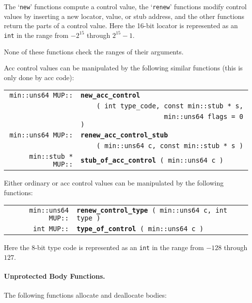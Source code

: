 \documentclass[12pt]{article}
\makeatletter
\newcommand{\subsubsubsection}[1]{\paragraph[#1]{#1.}}
\newcommand{\ttindex}[1]{\index{#1@{\tt #1}}}
\newcommand{\MUPindex}[1]{\ttindex{MUP::#1}\ttindex{#1}}
\newenvironment{indpar}[1][0.3in]%
	{\begin{list}{}%
		     {\setlength{\itemsep}{0in}%
		      \setlength{\topsep}{0in}%
		      \setlength{\parsep}{1ex}%
		      \setlength{\labelwidth}{#1}%
		      \setlength{\leftmargin}{#1}%
		      \addtolength{\leftmargin}{\labelsep}}%
	 \item}%
	{\end{list}}
\newcommand{\LABEL}[1]{\label{#1}}
\newcommand{\MUPKEY}[1]{{\tt \bf #1}\MUPindex{#1}}
\makeatother
\begin{document}
The `{\tt new}' functions compute a control value,
the `{\tt renew}' functions modify control values
by inserting a new locator, value, or stub address, and
the other functions return the parts of a control value.
Here the 16-bit locator is represented as an \verb|int|
in the range from $-2^{15}$ through $2^{15}-1$.

None of these functions check the ranges of their arguments.

Acc control values can be manipulated by the following similar functions
(this is only done by acc code):

\begin{indpar}\begin{tabular}{@{}r@{}l@{}}
\verb|min::uns64 MUP::|
    & \MUPKEY{new\_acc\_control} \\
    & \verb|    ( int type_code, const min::stub * s,| \\
    & \verb|                     min::uns64 flags = 0 )|
\LABEL{MUP::NEW_ACC_CONTROL_OF_STUB} \\
\verb|min::uns64 MUP::|
    & \MUPKEY{renew\_acc\_control\_stub} \\
    & \verb|    ( min::uns64 c, const min::stub * s )|
\LABEL{MUP::RENEW_ACC_CONTROL_STUB} \\
\verb|min::stub * MUP::|
    & \MUPKEY{stub\_of\_acc\_control}\verb| ( min::uns64 c )|
\LABEL{MUP::STUB_OF_ACC_CONTROL} \\
\end{tabular}\end{indpar}

Either ordinary or acc control values can be
manipulated by the following functions:

\begin{indpar}\begin{tabular}{@{}r@{}l@{}}
\verb|min::uns64 MUP::|
    & \MUPKEY{renew\_control\_type}\verb| ( min::uns64 c, int type )|
\LABEL{MUP::RENEW_CONTROL_TYPE} \\
\verb|int MUP::| & \MUPKEY{type\_of\_control}\verb| ( min::uns64 c )|
\LABEL{MUP::TYPE_OF_CONTROL} \\
\end{tabular}\end{indpar}

Here the 8-bit type code is represented as an {\tt int} in
the range from $-128$ through $127$.

\subsubsubsection{Unprotected Body Functions}
\label{UNPROTECTED-BODY-FUNCTIONS}

The following functions allocate and deallocate bodies:
\end{document}

